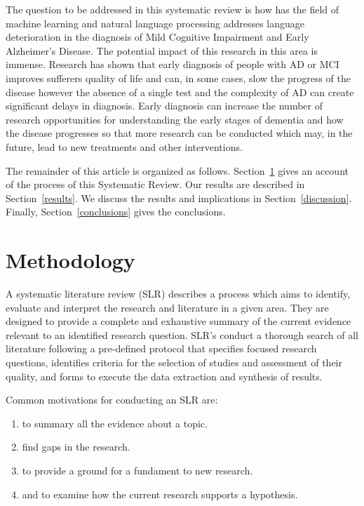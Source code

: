 \documentclass[10pt, letterpaper, twoside, openany]{thesis}
\begin{document}
\par
The question to be addressed in this systematic review is how has the field of machine learning and natural language processing addresses language deterioration in the diagnosis of Mild Cognitive Impairment and Early Alzheimer's Disease. The potential impact of this research in this area is immense. Research has shown that early diagnosis of people with AD or MCI improves sufferers quality of life and can, in some cases, slow the progress of the disease however the absence of a single test and the complexity of AD can create significant delays in diagnosis. Early diagnosis can increase the number of research opportunities for understanding the early stages of dementia and how the disease progresses so that more research can be conducted which may, in the future, lead to new treatments and other interventions.
\par 
The remainder of this article is organized as follows. Section~\ref{methodology} gives an account of the process of this Systematic Review. Our results are described in Section~\ref{results}. We discuss the results and implications in Section~\ref{discussion}. Finally, Section~\ref{conclusions} gives the conclusions.

\section{Methodology}\label{methodology}
A systematic literature review (SLR) describes a process which aims to identify, evaluate and interpret the research and literature in a given area. They are designed to provide a complete and exhaustive summary of the current evidence relevant to an identified research question. SLR's conduct a thorough search of all literature following a pre-defined protocol that specifies focused research questions, identifies criteria for the selection of studies and assessment of their quality, and forms to execute the data extraction and synthesis of results. 
\par 
Common motivations for conducting an SLR are: 
\begin{enumerate}
	\item to summary all the evidence about a topic.
	\item find gaps in the research. 
	\item to provide a ground for a fundament to new research.
	\item and to examine how the current research supports a hypothesis. 
\end{enumerate}
\end{document}
